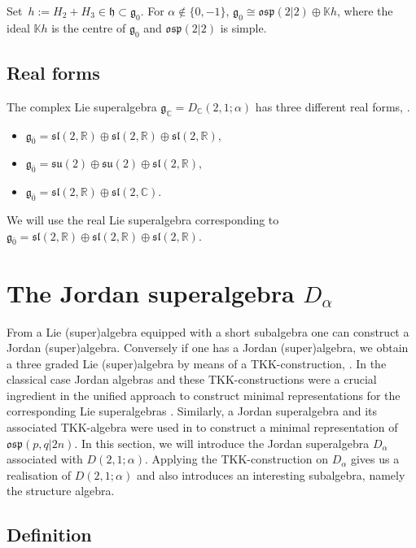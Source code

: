 \documentclass{amsart}
\numberwithin{theorem}{section}
\theoremstyle{definition}
\theoremstyle{remark}
\def\C{\mathds{C} }
\newcommand{\mf}[1]{\mathfrak{#1}}
\newcommand{\ds}[1]{\mathds{#1}}
\newcommand{\g}{{\mathfrak{g}}}
\newcommand{\oa}{\bar{0}}
\begin{document}
Set~$h:=H_{2}+H_{3}\in \mf h\subset\mf g_0$.
For $\alpha \not\in  \{0,-1\}$,  $\mf g_0\cong\mathfrak{osp}(2|2)\oplus\ds K h$, where the ideal $\ds K h$ is the centre of $\mf g_0$ and $\mathfrak{osp}(2|2)$ is simple.

\subsection{Real forms}

The complex Lie superalgebra $\g_\mathds{C} = D_\C(2,1;\alpha)$ has three different real forms, \cite[Theorem 2.5]{Pa}.
\begin{itemize}
\item $\g_{\oa}= \mathfrak{sl}(2,\ds R)\oplus \mathfrak{sl}(2,\ds R) \oplus \mathfrak{sl}(2,\ds R),$
\item $\g_{\oa}=\mathfrak{su}(2)\oplus \mathfrak{su}(2) \oplus \mathfrak{sl}(2,\ds R),$
\item $\g_{\oa}= \mathfrak{sl}(2,\ds R)\oplus \mathfrak{sl}(2,\ds C) $.
\end{itemize}
We will use the real Lie superalgebra corresponding to $\g_{\oa}= \mathfrak{sl}(2,\ds R)\oplus \mathfrak{sl}(2,\ds R) \oplus \mathfrak{sl}(2,\ds R)$. 

\section{The Jordan superalgebra $D_\alpha$}\label{Section Jordan}

From a Lie (super)algebra equipped with a short subalgebra one can construct a Jordan (super)algebra. Conversely if one has a Jordan (super)algebra, we obtain a three graded Lie (super)algebra by means of a TKK-construction, \cite{CK}. 
In the classical case Jordan algebras and these TKK-constructions were a crucial ingredient in the unified approach to construct minimal representations for the corresponding Lie superalgebras \cite{HKM, HKMO}. Similarly, a Jordan superalgebra and its associated TKK-algebra were used in \cite{BF} to construct a minimal representation of $\mf{osp}(p,q|2n)$. In this section, we will introduce the Jordan superalgebra $D_\alpha$ associated with $D(2,1;\alpha)$. Applying the TKK-construction on $D_\alpha$ gives us a realisation of $D(2,1;\alpha)$ and also introduces an interesting subalgebra, namely the structure algebra.

\subsection{Definition}
\end{document}
